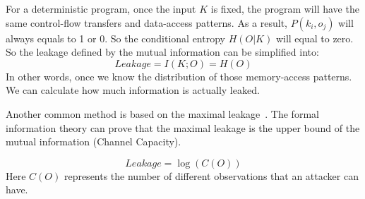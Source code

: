 For a deterministic program, once the input $K$ is fixed, the program will have the same
control-flow transfers and data-access patterns. As a result, $P(k_i, o_j)$ will always
equals to 1 or 0. So the conditional entropy $H(O|K)$ will equal to zero. So the leakage defined
by the mutual information can be simplified into:
\begin{displaymath}
\label{mutual:information}
    \mathit{Leakage} = I(K;O) = H(O)
\end{displaymath}
In other words, once we know the distribution of those memory-access patterns. We can 
calculate how much information is actually leaked.

Another common method is based on the maximal leakage~\cite{10.1007/978-3-642-00596-1_21,10.1007/978-3-642-31424-7_40,182946}.
The formal information theory can prove that the maximal leakage is the upper bound of the mutual 
information (Channel Capacity).

\begin{displaymath}
    \mathit{Leakage} = \log(C(O))
\end{displaymath}
Here $C(O)$ represents the number of different observations that an attacker can have. 







